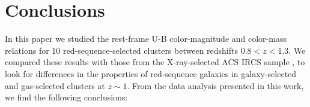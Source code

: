 

\section{Conclusions}\label{conclusions}

In this paper we studied the rest-frame U-B color-magnitude and color-mass relations for 10 red-sequence-selected clusters between redshifts $0.8 < z < 1.3$.
We compared these results with those from the X-ray-selected ACS IRCS sample \citep{Mei:2009wt}, to look for differences in the properties of red-sequence galaxies in galaxy-selected and gas-selected clusters at $z \sim 1$.
From the data analysis presented in this work, we find the following conclusions:

